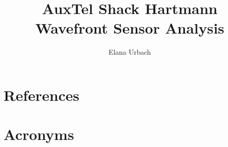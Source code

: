\documentclass[SE,authoryear,toc]{lsstdoc}
\title{AuxTel Shack Hartmann Wavefront Sensor Analysis}
\author{%
Elana Urbach
}
\date{\vcsDate}
\begin{document}
\maketitle


\appendix
\section{References} \label{sec:bib}
\renewcommand{\refname}{} %


\section{Acronyms} \label{sec:acronyms}

\end{document}
